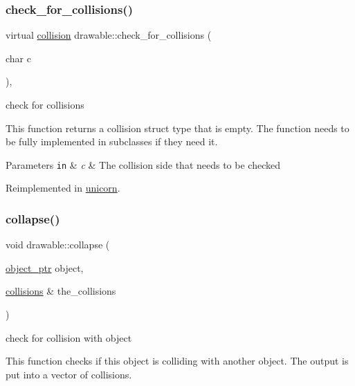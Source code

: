 \subsubsection{\texorpdfstring{check\+\_\+for\+\_\+collisions()}{check\_for\_collisions()}}
{\footnotesize\ttfamily virtual \hyperlink{structcollision}{collision} drawable\+::check\+\_\+for\+\_\+collisions (\begin{DoxyParamCaption}\item[{char}]{c }\end{DoxyParamCaption})\hspace{0.3cm}{\ttfamily [inline]}, {\ttfamily [virtual]}}



check for collisions 

This function returns a collision struct type that is empty. The function needs to be fully implemented in subclasses if they need it.


\begin{DoxyParams}[1]{Parameters}
\mbox{\tt in}  & {\em c} & The collision side that needs to be checked \\
\hline
\end{DoxyParams}


Reimplemented in \hyperlink{classunicorn_a40fe782f273abf46f6121db9aa4bf77a}{unicorn}.

\mbox{\label{classdrawable_af0ddd3660d258629598dc76b31d1cc49}} 
\subsubsection{\texorpdfstring{collapse()}{collapse()}}
{\footnotesize\ttfamily void drawable\+::collapse (\begin{DoxyParamCaption}\item[{\hyperlink{drawable_8hpp_aab5add95f06d2ba25dbfed8eb07274fa}{object\+\_\+ptr}}]{object,  }\item[{\hyperlink{drawable_8hpp_a7e1a7f34f6d09dabb4cdafd6e4118603}{collisions} \&}]{the\+\_\+collisions }\end{DoxyParamCaption})\hspace{0.3cm}{\ttfamily [virtual]}}



check for collision with object 

This function checks if this object is colliding with another object. The output is put into a vector of collisions.


